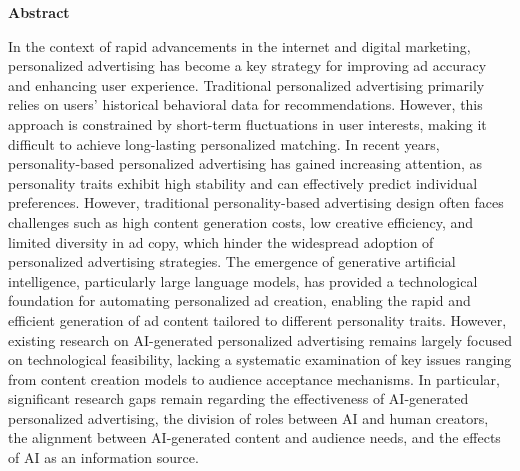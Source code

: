 \clearpage
\pagestyle{abstractstyle-eng}     %
\thispagestyle{abstractstyle-eng} %


\begin{center}
    \textbf{{\fontsize{16pt}{16pt}\selectfont Abstract}}
\end{center}


In the context of rapid advancements in the internet and digital marketing, personalized advertising has become a key strategy for improving ad accuracy and enhancing user experience. Traditional personalized advertising primarily relies on users’ historical behavioral data for recommendations. However, this approach is constrained by short-term fluctuations in user interests, making it difficult to achieve long-lasting personalized matching. In recent years, personality-based personalized advertising has gained increasing attention, as personality traits exhibit high stability and can effectively predict individual preferences. However, traditional personality-based advertising design often faces challenges such as high content generation costs, low creative efficiency, and limited diversity in ad copy, which hinder the widespread adoption of personalized advertising strategies. The emergence of generative artificial intelligence, particularly large language models, has provided a technological foundation for automating personalized ad creation, enabling the rapid and efficient generation of ad content tailored to different personality traits. However, existing research on AI-generated personalized advertising remains largely focused on technological feasibility, lacking a systematic examination of key issues ranging from content creation models to audience acceptance mechanisms. In particular, significant research gaps remain regarding the effectiveness of AI-generated personalized advertising, the division of roles between AI and human creators, the alignment between AI-generated content and audience needs, and the effects of AI as an information source.  

